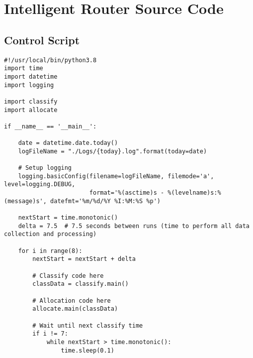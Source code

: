 \chapter{Intelligent Router Source Code}
\section{Control Script}
\begin{verbatim}
#!/usr/local/bin/python3.8
import time
import datetime
import logging

import classify
import allocate

if __name__ == '__main__':

    date = datetime.date.today()
    logFileName = "./Logs/{today}.log".format(today=date)

    # Setup logging
    logging.basicConfig(filename=logFileName, filemode='a', level=logging.DEBUG,
                        format='%(asctime)s - %(levelname)s:%(message)s', datefmt='%m/%d/%Y %I:%M:%S %p')

    nextStart = time.monotonic()
    delta = 7.5  # 7.5 seconds between runs (time to perform all data collection and processing)

    for i in range(8):
        nextStart = nextStart + delta

        # Classify code here
        classData = classify.main()

        # Allocation code here
        allocate.main(classData)

        # Wait until next classify time
        if i != 7:
            while nextStart > time.monotonic():
                time.sleep(0.1)
\end{verbatim}

